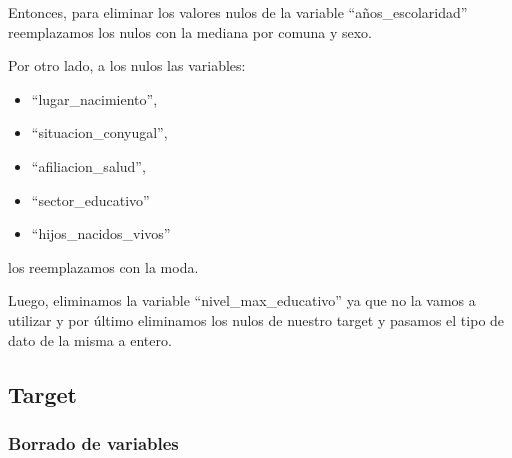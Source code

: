 \documentclass[a4paper]{article}
\begin{document}
        Entonces, para eliminar los valores nulos de la variable ``años\_escolaridad'' reemplazamos los nulos con la mediana por comuna y sexo.

        Por otro lado, a los nulos las variables:
        \begin{itemize}
            \item ``lugar\_nacimiento'',
            \item ``situacion\_conyugal'',
            \item ``afiliacion\_salud'',
            \item ``sector\_educativo''
            \item ``hijos\_nacidos\_vivos''
        \end{itemize}
        los reemplazamos con la moda.
        
        Luego, eliminamos la variable ``nivel\_max\_educativo'' ya que no la vamos a utilizar y por último eliminamos los nulos de nuestro target y pasamos el tipo de dato de la misma a entero. 
        

    \subsection{Target}

        \subsubsection{Borrado de variables}
    
\end{document}
